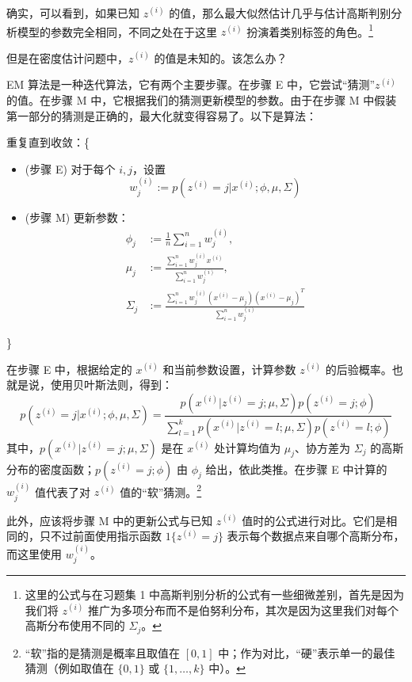 确实，可以看到，如果已知 $z^{(i)}$ 的值，那么最大似然估计几乎与估计高斯判别分析模型的参数完全相同，不同之处在于这里 $z^{(i)}$ 扮演着类别标签的角色。\footnote{这里的公式与在习题集 1 中高斯判别分析的公式有一些细微差别，首先是因为我们将 $z^{(i)}$ 推广为多项分布而不是伯努利分布，其次是因为这里我们对每个高斯分布使用不同的 $\Sigma_j$。}

但是在密度估计问题中，$z^{(i)}$ 的值是未知的。该怎么办？

EM 算法是一种迭代算法，它有两个主要步骤。在步骤 E 中，它尝试“猜测”$z^{(i)}$ 的值。在步骤 M 中，它根据我们的猜测更新模型的参数。由于在步骤 M 中假装第一部分的猜测是正确的，最大化就变得容易了。以下是算法：

重复直到收敛：\{
    \begin{itemize}
        \item[] \quad(步骤 E) 对于每个 $i, j$，设置
            \[
                w_j^{(i)} := p(z^{(i)} = j | x^{(i)}; \phi, \mu, \Sigma)
            \]
        \item[] \quad(步骤 M) 更新参数：
            \begin{align*}
                \phi_j &:= \frac{1}{n} \sum_{i=1}^n w_j^{(i)},\\
                \mu_j &:= \frac{\sum_{i=1}^n w_j^{(i)} x^{(i)}}{\sum_{i=1}^n w_j^{(i)}},\\
                \Sigma_j &:= \frac{\sum_{i=1}^n w_j^{(i)} (x^{(i)} - \mu_j)(x^{(i)} - \mu_j)^T}{\sum_{i=1}^n w_j^{(i)}}
            \end{align*}
    \end{itemize}

\}

在步骤 E 中，根据给定的 $x^{(i)}$ 和当前参数设置，计算参数 $z^{(i)}$ 的后验概率。也就是说，使用贝叶斯法则，得到：
\[
    p(z^{(i)} = j | x^{(i)}; \phi, \mu, \Sigma) = \frac{p(x^{(i)}|z^{(i)} = j; \mu, \Sigma)p(z^{(i)} = j; \phi)}{\sum_{l=1}^k p(x^{(i)}|z^{(i)} = l; \mu, \Sigma)p(z^{(i)} = l; \phi)}
\]
其中，$p(x^{(i)}|z^{(i)} = j; \mu, \Sigma)$ 是在 $x^{(i)}$ 处计算均值为 $\mu_j$、协方差为 $\Sigma_j$ 的高斯分布的密度函数；$p(z^{(i)} = j; \phi)$ 由 $\phi_j$ 给出，依此类推。在步骤 E 中计算的 $w_j^{(i)}$ 值代表了对 $z^{(i)}$ 值的“软”猜测。\footnote{“软”指的是猜测是概率且取值在 $[0, 1]$ 中；作为对比，“硬”表示单一的最佳猜测（例如取值在 $\{0, 1\}$ 或 $\{1, \dots, k\}$ 中）。}

此外，应该将步骤 M 中的更新公式与已知 $z^{(i)}$ 值时的公式进行对比。它们是相同的，只不过前面使用指示函数 $1\{z^{(i)} = j\}$ 表示每个数据点来自哪个高斯分布，而这里使用 $w_j^{(i)}$。

